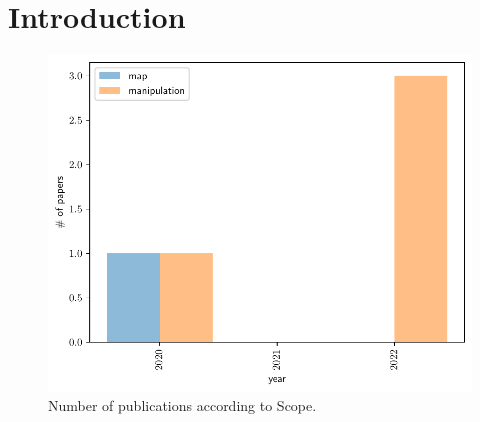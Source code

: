 \section{Introduction}\label{sec: introduction}

\begin{figure}[h]
	\centering
	\includegraphics[width=0.7\linewidth]{images/Scope}
	\caption{Number of publications according to Scope.}
	\label{fig:human}
\end{figure}
